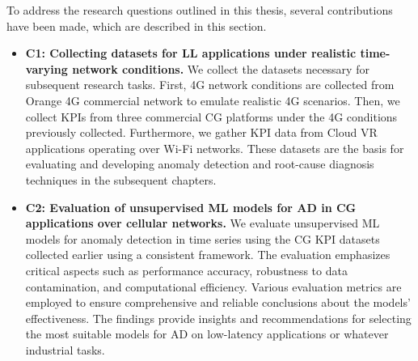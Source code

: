 To address the research questions outlined in this thesis, several contributions have been made, which are described in this section.

\begin{itemize}
    \item \textbf{C1: Collecting datasets for \ac{LL} applications under realistic time-varying network conditions.} We collect the datasets necessary for subsequent research tasks. First, 4G network conditions are collected from Orange 4G commercial network to emulate realistic 4G scenarios. Then, we collect KPIs from three commercial CG platforms under the 4G conditions previously collected. Furthermore, we gather KPI data from Cloud VR applications operating over Wi-Fi networks. These datasets are the basis for evaluating and developing anomaly detection and root-cause diagnosis techniques in the subsequent chapters.

    \item \textbf{C2: Evaluation of unsupervised ML models for AD in \ac{CG} applications over cellular networks.} We evaluate unsupervised ML models for anomaly detection in time series using the CG KPI datasets collected earlier using a consistent framework. The evaluation emphasizes critical aspects such as performance accuracy, robustness to data contamination, and computational efficiency. Various evaluation metrics are employed to ensure comprehensive and reliable conclusions about the models' effectiveness. The findings provide insights and recommendations for selecting the most suitable models for AD on low-latency applications or whatever industrial tasks.
    
\end{itemize}
